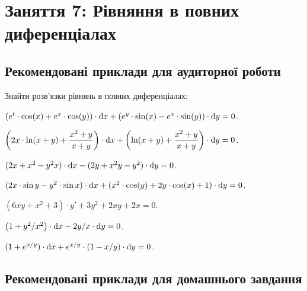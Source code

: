 \section*{Заняття 7: Рівняння в повних диференціалах}

\subsection*{Рекомендовані приклади для аудиторної роботи}

Знайти розв'язки рівнянь в повних диференціалах:

\begin{problem}
	$(e^t \cdot \cos (x) + e^x \cdot \cos (y)) \cdot \mathop{}\!\mathrm{d} x + (e^y \cdot \sin (x) - e^x \cdot \sin (y)) \cdot \mathop{}\!\mathrm{d} y = 0$.
\end{problem}

\begin{problem}
	$\left( 2 x \cdot \ln (x + y) + \dfrac{x^2 + y}{x + y} \right) \cdot \mathop{}\!\mathrm{d} x + \left( \ln (x + y) + \dfrac{x^2 + y}{x + y} \right) \cdot \mathop{}\!\mathrm{d} y = 0$.
\end{problem}

\begin{problem}
	$(2 x + x^2 - y^2 x) \cdot \mathop{}\!\mathrm{d} x - (2 y + x^2 y - y^2) \cdot \mathop{}\!\mathrm{d} y = 0$.
\end{problem}

\begin{problem}
	$(2 x \cdot \sin y - y^2 \cdot \sin x) \cdot \mathop{}\!\mathrm{d} x + (x^2 \cdot \cos (y) + 2 y \cdot \cos (x) + 1) \cdot \mathop{}\!\mathrm{d} y = 0$.
\end{problem}

\begin{problem}
	$(6 x y + x^2 + 3) \cdot y' + 3 y^2 + 2 x y + 2 x = 0$.
\end{problem}

\begin{problem}
	$\left( 1 + y^2 / x^2 \right) \cdot \mathop{}\!\mathrm{d} x - 2 y / x \cdot \mathop{}\!\mathrm{d} y = 0$.
\end{problem}

\begin{problem}
	$(1 + e^{x / y}) \cdot \mathop{}\!\mathrm{d} x + e^{x / y} \cdot (1 - x / y) \cdot \mathop{}\!\mathrm{d} y = 0$.
\end{problem}

\subsection*{Рекомендовані приклади для домашнього завдання}

